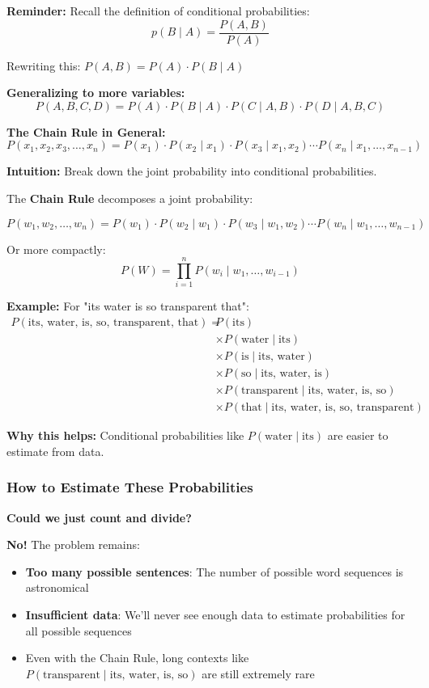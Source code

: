 \documentclass[11pt,a4paper]{article}
\theoremstyle{definition}
\theoremstyle{plain}
\theoremstyle{remark}
\begin{document}
\textbf{Reminder:} Recall the definition of conditional probabilities:
\[
p(B \mid A) = \frac{P(A,B)}{P(A)}
\]

Rewriting this: $P(A,B) = P(A) \cdot P(B \mid A)$

\textbf{Generalizing to more variables:}
\[
P(A,B,C,D) = P(A) \cdot P(B \mid A) \cdot P(C \mid A,B) \cdot P(D \mid A,B,C)
\]

\textbf{The Chain Rule in General:}
\[
P(x_1, x_2, x_3, \ldots, x_n) = P(x_1) \cdot P(x_2 \mid x_1) \cdot P(x_3 \mid x_1, x_2) \cdots P(x_n \mid x_1, \ldots, x_{n-1})
\]

\textbf{Intuition:} Break down the joint probability into conditional probabilities.

The \textbf{Chain Rule} decomposes a joint probability:

\[
P(w_1, w_2, \ldots, w_n) = P(w_1) \cdot P(w_2 \mid w_1) \cdot P(w_3 \mid w_1, w_2) \cdots P(w_n \mid w_1, \ldots, w_{n-1})
\]

Or more compactly:
\[
P(W) = \prod_{i=1}^{n} P(w_i \mid w_1, \ldots, w_{i-1})
\]

\textbf{Example:} For "its water is so transparent that":
\begin{align*}
P(\text{its, water, is, so, transparent, that}) = \; & P(\text{its}) \\
& \times P(\text{water} \mid \text{its}) \\
& \times P(\text{is} \mid \text{its, water}) \\
& \times P(\text{so} \mid \text{its, water, is}) \\
& \times P(\text{transparent} \mid \text{its, water, is, so}) \\
& \times P(\text{that} \mid \text{its, water, is, so, transparent})
\end{align*}

\textbf{Why this helps:} Conditional probabilities like $P(\text{water} \mid \text{its})$ are easier to estimate from data.

\subsubsection{How to Estimate These Probabilities}

\textbf{Could we just count and divide?}

\textbf{No!} The problem remains:
\begin{itemize}
    \item \textbf{Too many possible sentences}: The number of possible word sequences is astronomical
    \item \textbf{Insufficient data}: We'll never see enough data to estimate probabilities for all possible sequences
    \item Even with the Chain Rule, long contexts like $P(\text{transparent} \mid \text{its, water, is, so})$ are still extremely rare
\end{itemize}
\end{document}
